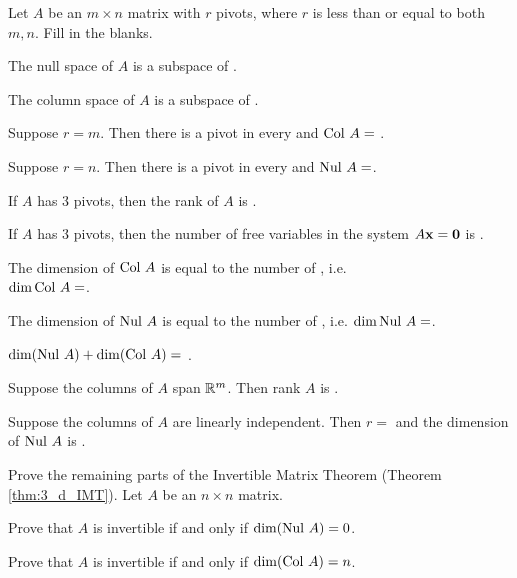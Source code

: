 \item Let $A$ be an $m \times n$ matrix with $r$ pivots, where $r$ is less than or equal to both $m, n$. Fill in the blanks.
	\ba
	\item The null space of $A$ is a subspace of \underline{\hspace{1.5cm}}.
	\item The column space of $A$ is a subspace of  \underline{\hspace{1.5cm}}.
	\item Suppose $r=m$. Then there is a pivot in every \underline{\hspace{2cm}} and $\text{Col } A =$ \underline{\hspace{1.5cm}}.
	\item Suppose $r=n$. Then there is a pivot in every \underline{\hspace{2cm}} and $\text{Nul } A= $\underline{\hspace{2cm}}.
	\item If $A$ has 3 pivots, then the rank of $A$ is \underline{\hspace{1.5cm}}.
	\item If $A$ has 3 pivots, then the number of free variables in the system $A \mathbf{x} = \mathbf{0}$ is \underline{\hspace{1.5cm}}.
	\item The dimension of $\text{Col } A$ is equal to the number of \underline{\hspace{3cm}}, i.e. \\
	$\dim \text{Col } A = $\underline{\hspace{1cm}}.
	\item The dimension of $\text{Nul } A$ is equal to the number of \underline{\hspace{4cm}}, i.e. $\dim \text{Nul } A =$\underline{\hspace{1.5cm}}.
	\item $\dim(\text{Nul } A) + \dim(\text{Col } A) = $ \underline{\hspace{1.5cm}}.
	\item Suppose the columns of $A$ span $\mathbb{R}^m$. Then rank $A$ is \underline{\hspace{2cm}}.
	\item Suppose the columns of $A$ are linearly independent. Then $r= $ \underline{\hspace{1.5cm}} and the dimension of $\text{Nul } A$ is \underline{\hspace{1.5cm}}.
	\ea
	

\item Prove the remaining parts of the Invertible Matrix Theorem (Theorem \ref{thm:3_d_IMT}).  Let $A$ be an $n \times n$ matrix. 
	\ba
	\item Prove that $A$ is invertible if and only if $\dim(\text{Nul } A)= 0$.
	\item Prove that $A$ is invertible if and only if $\dim(\text{Col } A) = n$. 
	\ea


